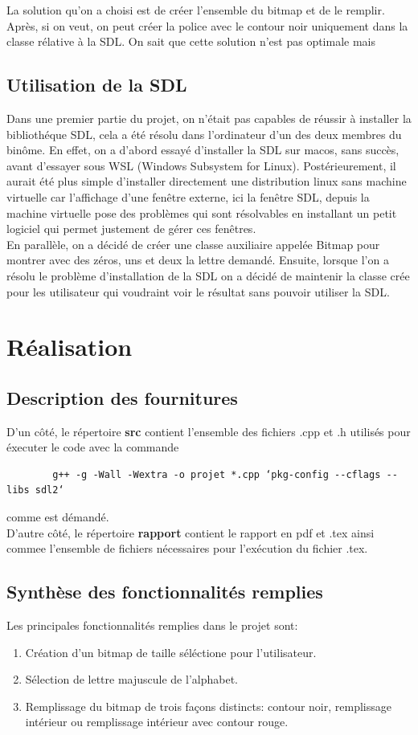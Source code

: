 \documentclass[11pt,a4paper]{article}
\begin{document}
	La solution qu'on a choisi est de créer l'ensemble du bitmap et de le remplir. Après, si on veut, on  peut créer la police avec le contour noir uniquement dans la classe rélative à la SDL. On sait que cette solution n'est pas optimale mais
	
	\subsection{Utilisation de la SDL}
	Dans une premier partie du projet, on n'était pas capables de réussir à installer la bibliothéque SDL, cela a été résolu dans l'ordinateur d'un des deux membres du binôme. En effet, on a d'abord essayé d'installer la SDL sur macos, sans succès, avant d'essayer sous WSL (Windows Subsystem for Linux). Postérieurement, il aurait été plus simple d'installer directement une distribution linux sans machine virtuelle car l'affichage d'une fenêtre externe, ici la fenêtre SDL, depuis la machine virtuelle pose des problèmes qui sont résolvables en installant un petit logiciel qui permet justement de gérer ces fenêtres. \\
	
	En parallèle, on a décidé de créer une classe auxiliaire appelée Bitmap pour montrer avec des zéros, uns et deux la lettre demandé. Ensuite, lorsque l'on a résolu le problème d'installation de la SDL on a décidé de maintenir la classe crée pour les utilisateur qui voudraint voir le résultat sans pouvoir utiliser la SDL.
	
	\newpage
	\section{Réalisation}
	\subsection{Description des fournitures}
	D'un côté, le répertoire \textbf{src} contient l'ensemble des fichiers .cpp et .h utilisés pour éxecuter le code avec la commande
	\begin{verbatim}
		g++ -g -Wall -Wextra -o projet *.cpp ‘pkg-config --cflags --libs sdl2‘
	\end{verbatim}
	comme est démandé.\\
	
	D'autre côté, le répertoire \textbf{rapport} contient le rapport en pdf et .tex ainsi commee l'ensemble de fichiers nécessaires pour l'exécution du fichier .tex.
	
	\subsection{Synthèse des fonctionnalités remplies}
	Les principales fonctionnalités remplies dans le projet sont:
	\begin{enumerate}
		\item Création d'un bitmap de taille séléctione pour l'utilisateur.
		\item Sélection de lettre majuscule de l'alphabet.
		\item Remplissage du bitmap de trois façons distincts: contour noir, remplissage intérieur ou remplissage intérieur avec contour rouge.
	\end{enumerate}
	
\end{document}
